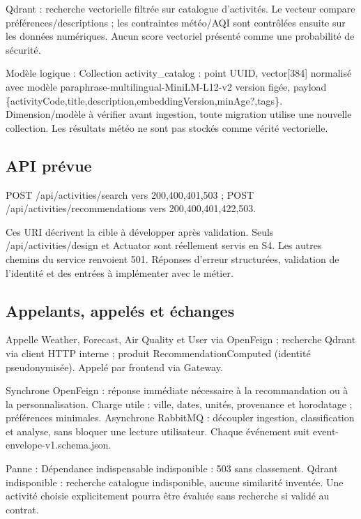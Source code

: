 \documentclass[10pt,a4paper]{article}
\begin{document}
Qdrant : recherche vectorielle filtrée sur catalogue d'activités. Le vecteur compare préférences/descriptions ; les contraintes météo/AQI sont contrôlées ensuite sur les données numériques. Aucun score vectoriel présenté comme une probabilité de sécurité.\par

Modèle logique : Collection activity\_catalog : point UUID, vector[384] normalisé avec modèle paraphrase-multilingual-MiniLM-L12-v2 version figée, payload \{activityCode,title,description,embeddingVersion,minAge?,tags\}. Dimension/modèle à vérifier avant ingestion, toute migration utilise une nouvelle collection. Les résultats météo ne sont pas stockés comme vérité vectorielle.\par

\subsection*{API prévue}

POST /api/activities/search  vers  200,400,401,503 ; POST /api/activities/recommendations  vers  200,400,401,422,503.\par

Ces URI décrivent la cible à développer après validation. Seuls /api/activities/design et Actuator sont réellement servis en S4. Les autres chemins du service renvoient 501. Réponses d'erreur structurées, validation de l'identité et des entrées à implémenter avec le métier.\par

\subsection*{Appelants, appelés et échanges}

Appelle Weather, Forecast, Air Quality et User via OpenFeign ; recherche Qdrant via client HTTP interne ; produit RecommendationComputed (identité pseudonymisée). Appelé par frontend via Gateway.\par

Synchrone OpenFeign : réponse immédiate nécessaire à la recommandation ou à la personnalisation. Charge utile : ville, dates, unités, provenance et horodatage ; préférences minimales. Asynchrone RabbitMQ : découpler ingestion, classification et analyse, sans bloquer une lecture utilisateur. Chaque événement suit event-envelope-v1.schema.json.\par

Panne : Dépendance indispensable indisponible : 503 sans classement. Qdrant indisponible : recherche catalogue indisponible, aucune similarité inventée. Une activité choisie explicitement pourra être évaluée sans recherche si validé au contrat.\par
\end{document}

